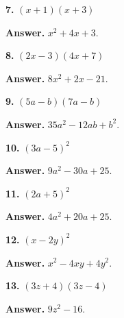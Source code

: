 \documentclass{ximera}
\begin{document}
\begin{problem}

\textbf{7.} $(x+1)(x+3)$

\begin{hint}
\textbf{Answer.} $x^{2} + 4 x + 3$.
\end{hint}
\end{problem}

\begin{problem}

\textbf{8.} $(2x-3)(4x+7)$

\begin{hint}
\textbf{Answer.} $8 x^{2} + 2 x - 21$.
\end{hint}
\end{problem}

\begin{problem}

\textbf{9.} $(5a-b)(7a-b)$

\begin{hint}
\textbf{Answer.} $35 a^{2} - 12 a b + b^{2}$.
\end{hint}
\end{problem}

\begin{problem}

\textbf{10.} $(3a-5)^{2}$

\begin{hint}
\textbf{Answer.} $9 a^{2} - 30 a + 25$.
\end{hint}
\end{problem}

\begin{problem}

\textbf{11.} $(2a+5)^{2}$

\begin{hint}
\textbf{Answer.} $4 a^{2} + 20 a + 25$.
\end{hint}
\end{problem}

\begin{problem}

\textbf{12.} $(x-2y)^{2}$

\begin{hint}
\textbf{Answer.} $x^{2} - 4 x y + 4 y^{2}$.
\end{hint}
\end{problem}

\begin{problem}

\textbf{13.} $(3z+4)(3z-4)$

\begin{hint}
\textbf{Answer.} $9 z^{2} - 16$.
\end{hint}
\end{problem}
\end{document}
